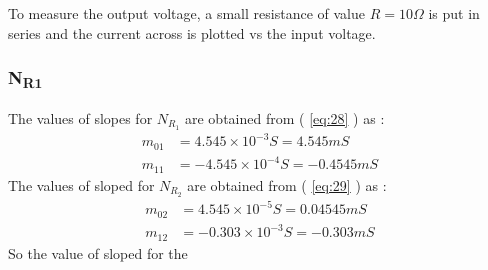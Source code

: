 \documentclass[12pt]{article}
\newcommand*{\myref}[1]{%
  \begingroup
    \hypersetup{
      linkcolor=linkequation,
      linkbordercolor=linkequation,
    }%
    \ref{#1}%
  \endgroup
}
\begin{document}
To measure the output voltage, a small resistance of value $R=10\Omega$ is put in series and the current across is plotted vs the input voltage.
%
\subsubsection{N\textsubscript{R1}}

The values of slopes for $N_{R_1}$ are obtained from (\myref{eq:28}) as :
\begin{align*}
	m_{01}&=4.545\times 10^{-3} S = 4.545 mS \\ 
	m_{11}&= -4.545\times 10^{-4} S = -0.4545 mS 
\end{align*}
The values of sloped for $N_{R_2}$ are obtained from (\myref{eq:29}) as :
\begin{align*}
	m_{02}&=4.545\times 10^{-5}S = 0.04545 mS \\
	m_{12}&=-0.303\times 10^{-3}S = -0.303 mS
\end{align*}
So the value of sloped for the 
\end{document}
